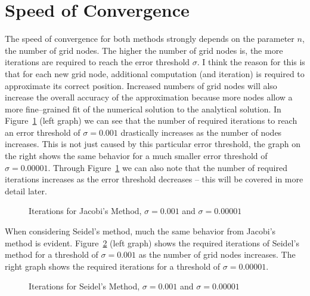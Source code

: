 \documentclass[a4paper,12pt,reqno]{article}
\newcommand{\figref}[1]{Figure~\ref{#1}}
\begin{document}
\section{Speed of Convergence}

The speed of convergence for both methods strongly depends on the parameter
$n$, the number of grid nodes. The higher the number of grid nodes is, the more
iterations are required to reach the error threshold $\sigma$. I think the 
reason for this is that for each new grid node, additional computation (and 
iteration) is required to approximate its correct position. Increased numbers 
of grid nodes will also increase the overall accuracy of the approximation 
because more nodes allow a more fine--grained fit of the numerical solution to
the analytical solution.\newline
In \figref{n_jacobi} (left graph) we can see that the number of required 
iterations to reach an error threshold of $\sigma=0.001$ drastically increases 
as the number of nodes increases. This is not just caused by this particular 
error threshold, the graph on the right shows the same behavior for a much 
smaller error threshold of $\sigma=0.00001$.
Through \figref{n_jacobi} we can also note that the number of required 
iterations increases as the error threshold decreases -- this will be covered 
in more detail later.
\begin{figure}[H]
    \center
    \hspace{3pt}
    \caption{Iterations for Jacobi's Method, $\sigma=0.001$ and $\sigma=0.00001$}
    \label{n_jacobi}
\end{figure}

When considering Seidel's method, much the same behavior from Jacobi's method 
is evident.
\figref{n_seidel} (left graph) shows the required iterations of Seidel's
method for a 
threshold of $\sigma=0.001$ as the number of grid nodes increases. 
The right graph shows the required iterations for a threshold of
$\sigma=0.00001$.
\begin{figure}[H]
    \center
    \hspace{3pt}
    \caption{Iterations for Seidel's Method, $\sigma=0.001$ and $\sigma=0.00001$}
    \label{n_seidel}
\end{figure}
\end{document}
